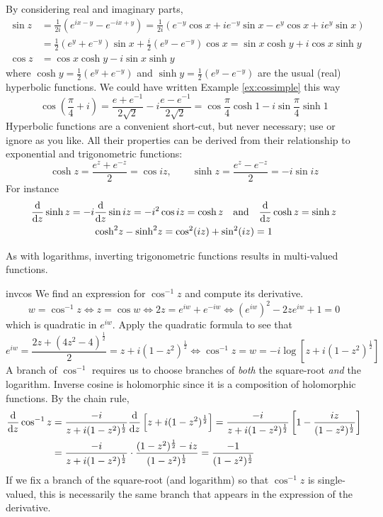 \begin{aside}
	
	By considering real and imaginary parts, 
	\begin{align*}
		\sin z&=\frac 1{2i}(e^{ix-y}-e^{-ix+y})=\frac 1{2i}(e^{-y}\cos x+ie^{-y}\sin x-e^y\cos x+ie^y\sin x)\\
		&=\frac 12(e^y+e^{-y})\sin x+\frac i2(e^y-e^{-y})\cos x = \sin x\cosh y+i\cos x\sinh y\\
		\cos z&=\cos x\cosh y-i\sin x\sinh y
	\end{align*}
	where $\cosh y=\frac 12(e^y+e^{-y})$ and $\sinh y=\frac 12(e^y-e^{-y})$ are the usual (real) hyperbolic functions. We could have written Example \ref{ex:cossimple} this way
	\[
		\cos\left(\frac\pi 4+i\right) =\frac{e+e^{-1}}{2\sqrt 2}-i\frac{e-e^{-1}}{2\sqrt 2} =\cos\frac\pi 4\cosh 1-i\sin\frac\pi 4\sinh 1
	\]
	Hyperbolic functions are a convenient short-cut, but never necessary; use or ignore as you like. All their properties can be derived from their relationship to exponential and trigonometric functions:
	\[
		\cosh z=\frac{e^z+e^{-z}}2=\cos iz,\qquad \sinh z=\frac{e^z-e^{-z}}2=-i\sin iz
	\]
	For instance
	\begin{gather*}
		\frac{\mathrm{d} }{\mathrm{d} z}\sinh z=-i\frac{\mathrm{d} }{\mathrm{d} z}\sin iz=-i^2\cos iz=\cosh z
		\quad\text{and}\quad
		\frac{\mathrm{d} }{\mathrm{d} z}\cosh z=\sinh z\\
		\cosh^2\!z-\sinh^2\!z=\cos^2 (iz)+\sin^2 (iz)=1
	\end{gather*}
\end{aside}



As with logarithms, inverting trigonometric functions results in multi-valued functions.

\begin{example}{}{invcos}
	We find an expression for $\cos^{-1}z$ and compute its derivative.
	\[
		w=\cos^{-1}z\iff z=\cos w\iff 2z=e^{iw}+e^{-iw}\iff (e^{iw})^2-2ze^{iw}+1=0
	\]
	which is quadratic in $e^{iw}$. Apply the quadratic formula to see that
	\[
		e^{iw}=\frac{2z+(4z^2-4)^{\frac 12}}2=z+i(1-z^2)^{\frac 12} \iff \cos^{-1}z=w=-i\log\left[z+i(1-z^2)^{\frac 12}\right]
	\]
	A branch of $\cos^{-1}$ requires us to choose branches of \emph{both} the square-root \emph{and} the logarithm.\smallbreak
	Inverse cosine is holomorphic since it is a composition of holomorphic functions. By the chain rule,
	\begin{align*}
		\frac{\mathrm{d} }{\mathrm{d} z}\cos^{-1}z&=\frac{-i}{z+i(1-z^2)^{\frac 12}}\frac{\mathrm{d} }{\mathrm{d} z}\left[z+i(1-z^2)^{\frac 12}\right] =\frac{-i}{z+i(1-z^2)^{\frac 12}}\left[1-\frac{iz}{(1-z^2)^{\frac 12}}\right]\\
		&=\frac{-i}{z+i(1-z^2)^{\frac 12}}\cdot\frac{(1-z^2)^{\frac 12}-iz}{(1-z^2)^{\frac 12}} =\frac{-1}{(1-z^2)^{\frac 12}}
	\end{align*}
	If we fix a branch of the square-root (and logarithm) so that $\cos^{-1}z$ is single-valued, this is necessarily the same branch that appears in the expression of the derivative. 
\end{example}

